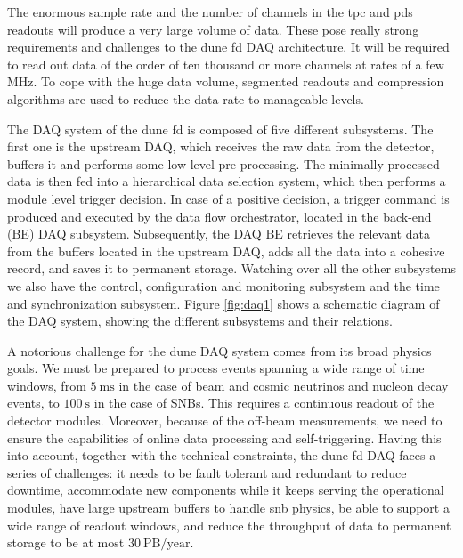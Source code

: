 The enormous sample rate and the number of channels in the \gls{tpc} and \gls{pds} readouts will produce a very large volume of data. These pose really strong requirements and challenges to the \gls{dune} \gls{fd} DAQ architecture. It will be required to read out data of the order of ten thousand or more channels at rates of a few MHz. To cope with the huge data volume, segmented readouts and compression algorithms are used to reduce the data rate to manageable levels.

The DAQ system of the \gls{dune} \gls{fd} is composed of five different subsystems. The first one is the upstream DAQ, which receives the raw data from the detector, buffers it and performs some low-level pre-processing. The minimally processed data is then fed into a hierarchical data selection system, which then performs a module level trigger decision. In case of a positive decision, a trigger command is produced and executed by the data flow orchestrator, located in the back-end (BE) DAQ subsystem. Subsequently, the DAQ BE retrieves the relevant data from the buffers located in the upstream DAQ, adds all the data into a cohesive record, and saves it to permanent storage. Watching over all the other subsystems we also have the control, configuration and monitoring subsystem and the time and synchronization subsystem. Figure \ref{fig:daq1} shows a schematic diagram of the DAQ system, showing the different subsystems and their relations.

A notorious challenge for the \gls{dune} DAQ system comes from its broad physics goals. We must be prepared to process events spanning a wide range of time windows, from $5 \ \mathrm{ms}$ in the case of beam and cosmic neutrinos and nucleon decay events, to $100 \ \mathrm{s}$ in the case of SNBs. This requires a continuous readout of the detector modules. Moreover, because of the off-beam measurements, we need to ensure the capabilities of online data processing and self-triggering. Having this into account, together with the technical constraints, the \gls{dune} \gls{fd} DAQ faces a series of challenges: it needs to be fault tolerant and redundant to reduce downtime, accommodate new components while it keeps serving the operational modules, have large upstream buffers to handle \gls{snb} physics, be able to support a wide range of readout windows, and reduce the throughput of data to permanent storage to be at most $30 \ \mathrm{PB/year}$.